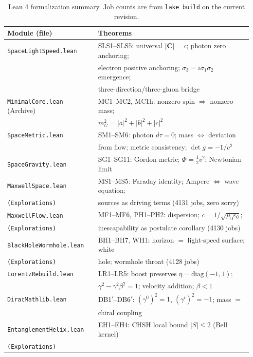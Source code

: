 \documentclass[aps,prd,preprint,superscriptaddress,amsmath,amssymb]{revtex4-2}
\begin{document}
\begin{table}[h]
\caption{Lean 4 formalization summary.  Job counts are from
\texttt{lake build} on the current revision.}
\label{tab:lean}
\begin{ruledtabular}
\begin{tabular}{ll}
Module (file) & Theorems \\
\hline
\texttt{SpaceLightSpeed.lean} & SLS1--SLS5: universal $|\bm{C}|=c$; photon zero anchoring; \\
 & electron positive anchoring; $\sigma_3=i\sigma_1\sigma_2$ emergence; \\
 & three-direction/three-gluon bridge \\
\texttt{MinimalCore.lean} (Archive) & MC1--MC2, MC1h: nonzero spin $\Rightarrow$ nonzero mass; \\
 & $m_G^2=|a|^2+|b|^2+|c|^2$ \\
\texttt{SpaceMetric.lean} & SM1--SM6: photon $d\tau=0$; mass $\Leftrightarrow$ deviation \\
 & from flow; metric consistency; $\det g=-1/c^2$ \\
\texttt{SpaceGravity.lean} & SG1--SG11: Gordon metric; $\Phi=\frac12 v^2$; Newtonian limit \\
\texttt{MaxwellSpace.lean} & MS1--MS5: Faraday identity; Ampere $\Leftrightarrow$ wave equation; \\
\texttt{(Explorations)} & sources as driving terms (4131 jobs, zero sorry) \\
\texttt{MaxwellFlow.lean} & MF1--MF6, PH1--PH2: dispersion; $c=1/\sqrt{\mu_0\varepsilon_0}$; \\
\texttt{(Explorations)} & inescapability as postulate corollary (4130 jobs) \\
\texttt{BlackHoleWormhole.lean} & BH1--BH7, WH1: horizon $=$ light-speed surface; white \\
\texttt{(Explorations)} & hole; wormhole throat (4128 jobs) \\
\texttt{LorentzRebuild.lean} & LR1--LR5: boost preserves $\eta=\mathrm{diag}(-1,1)$; \\
 & $\gamma^2-\gamma^2\beta^2=1$; velocity addition; $\beta<1$ \\
\texttt{DiracMathlib.lean} & DB1$'$--DB6$'$: $(\gamma^0)^2=1$, $(\gamma^i)^2=-1$; mass $=$ \\
 & chiral coupling \\
\texttt{EntanglementHelix.lean} & EH1--EH4: CHSH local bound $|S|\leq2$ (Bell kernel) \\
\texttt{(Explorations)} & \\
\end{tabular}
\end{ruledtabular}
\end{table}
\end{document}
